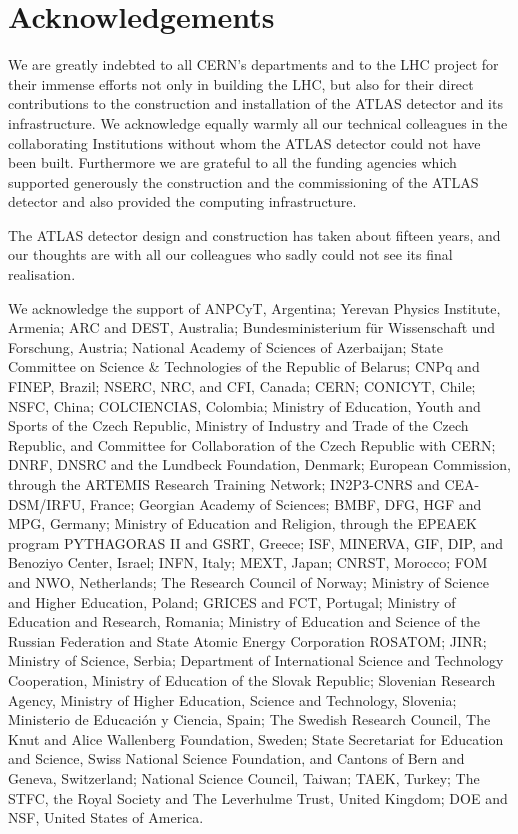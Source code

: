 \documentclass[11pt,a4paper,dvips]{article}
\begin{document}
\section{Acknowledgements}

We are greatly indebted to all CERN's departments and to the LHC project for their immense efforts not only in building the LHC, but also for their direct contributions to the construction and installation of the ATLAS detector and its infrastructure. We acknowledge equally warmly all our technical colleagues in the collaborating Institutions without whom the ATLAS detector could not have been built. Furthermore we are grateful to all the funding agencies which supported generously the construction and the commissioning of the ATLAS detector and also provided the computing infrastructure.

The ATLAS detector design and construction has taken about fifteen years, and our thoughts are with all our colleagues who sadly could not see its final realisation.

We acknowledge the support of ANPCyT, Argentina; Yerevan Physics Institute, Armenia; ARC and DEST, Australia; Bundesministerium f\"ur Wissenschaft und Forschung, Austria; National Academy of Sciences of Azerbaijan; State Committee on Science \& Technologies of the Republic of Belarus; CNPq and FINEP, Brazil; NSERC, NRC, and CFI, Canada; CERN; CONICYT, Chile; NSFC, China; COLCIENCIAS, Colombia; Ministry of Education, Youth and Sports of the Czech Republic, Ministry of Industry and Trade of the Czech Republic, and Committee for Collaboration of the Czech Republic with CERN; DNRF, DNSRC and the Lundbeck Foundation, Denmark;  European Commission, through the ARTEMIS Research Training Network; IN2P3-CNRS and CEA-DSM/IRFU, France; Georgian Academy of Sciences; BMBF, DFG, HGF and MPG, Germany; Ministry of Education and Religion, through the EPEAEK program PYTHAGORAS II and GSRT, Greece; ISF, MINERVA, GIF, DIP, and Benoziyo Center, Israel; INFN, Italy; MEXT, Japan; CNRST, Morocco; FOM and NWO, Netherlands; The Research Council of Norway; Ministry of Science and Higher Education, Poland; GRICES and FCT, Portugal; Ministry of Education and Research, Romania; Ministry of Education and Science of the Russian Federation and State Atomic Energy Corporation ROSATOM; JINR; Ministry of Science, Serbia; Department of International Science and Technology Cooperation, Ministry of Education of the Slovak Republic; Slovenian Research Agency, Ministry of Higher Education, Science and Technology, Slovenia; Ministerio de Educaci\'{o}n y Ciencia, Spain; The Swedish Research Council, The Knut and Alice Wallenberg Foundation, Sweden; State Secretariat for Education and Science, Swiss National Science Foundation, and Cantons of Bern and Geneva, Switzerland; National Science Council, Taiwan; TAEK, Turkey; The STFC, the Royal Society and The Leverhulme Trust, United Kingdom; DOE and NSF, United States of America. 
\end{document}
